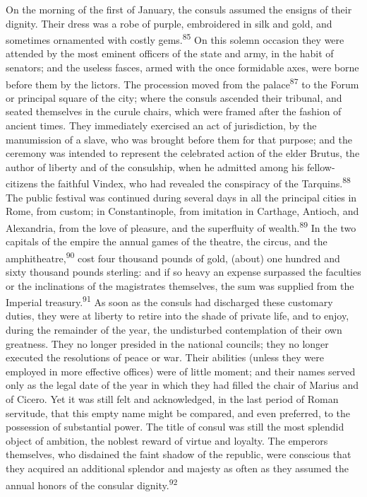 On the morning of the first of January, the consuls assumed the
ensigns of their dignity. Their dress was a robe of purple,
embroidered in silk and gold, and sometimes ornamented with
costly gems.\textsuperscript{85} On this solemn occasion they were attended by the
most eminent officers of the state and army, in the habit of
senators; and the useless fasces, armed with the once formidable
axes, were borne before them by the lictors. The procession moved
from the palace\textsuperscript{87} to the Forum or principal square of the city;
where the consuls ascended their tribunal, and seated themselves
in the curule chairs, which were framed after the fashion of
ancient times. They immediately exercised an act of jurisdiction,
by the manumission of a slave, who was brought before them for
that purpose; and the ceremony was intended to represent the
celebrated action of the elder Brutus, the author of liberty and
of the consulship, when he admitted among his fellow-citizens the
faithful Vindex, who had revealed the conspiracy of the Tarquins.\textsuperscript{88}
The public festival was continued during several days in all
the principal cities in Rome, from custom; in Constantinople,
from imitation in Carthage, Antioch, and Alexandria, from the
love of pleasure, and the superfluity of wealth.\textsuperscript{89} In the two
capitals of the empire the annual games of the theatre, the
circus, and the amphitheatre,\textsuperscript{90} cost four thousand pounds of
gold, (about) one hundred and sixty thousand pounds sterling: and
if so heavy an expense surpassed the faculties or the
inclinations of the magistrates themselves, the sum was supplied
from the Imperial treasury.\textsuperscript{91} As soon as the consuls had
discharged these customary duties, they were at liberty to retire
into the shade of private life, and to enjoy, during the
remainder of the year, the undisturbed contemplation of their own
greatness. They no longer presided in the national councils; they
no longer executed the resolutions of peace or war. Their
abilities (unless they were employed in more effective offices)
were of little moment; and their names served only as the legal
date of the year in which they had filled the chair of Marius and
of Cicero. Yet it was still felt and acknowledged, in the last
period of Roman servitude, that this empty name might be
compared, and even preferred, to the possession of substantial
power. The title of consul was still the most splendid object of
ambition, the noblest reward of virtue and loyalty. The emperors
themselves, who disdained the faint shadow of the republic, were
conscious that they acquired an additional splendor and majesty
as often as they assumed the annual honors of the consular
dignity.\textsuperscript{92}

